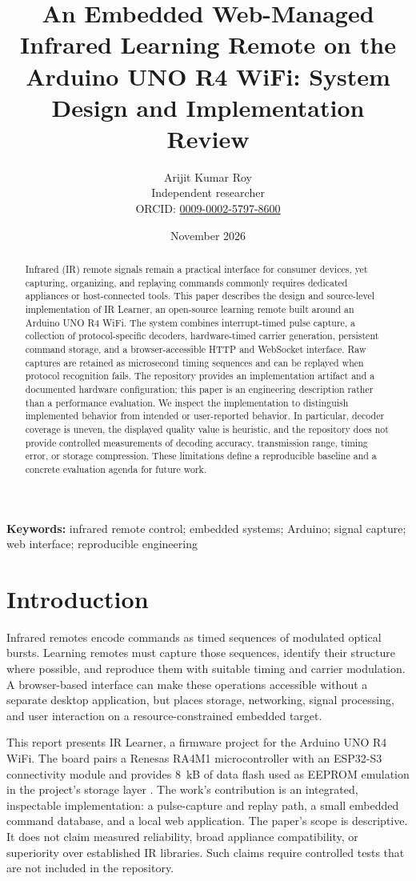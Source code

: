 \documentclass[11pt]{article}
\title{An Embedded Web-Managed Infrared Learning Remote on the Arduino UNO R4 WiFi: System Design and Implementation Review}
\author{Arijit Kumar Roy\\\small Independent researcher\\\small ORCID: \href{https://orcid.org/0009-0002-5797-8600}{0009-0002-5797-8600}}
\date{November 2026}
\begin{document}
\maketitle

\begin{abstract}
Infrared (IR) remote signals remain a practical interface for consumer devices, yet capturing, organizing, and replaying commands commonly requires dedicated appliances or host-connected tools. This paper describes the design and source-level implementation of IR Learner, an open-source learning remote built around an Arduino UNO R4 WiFi. The system combines interrupt-timed pulse capture, a collection of protocol-specific decoders, hardware-timed carrier generation, persistent command storage, and a browser-accessible HTTP and WebSocket interface. Raw captures are retained as microsecond timing sequences and can be replayed when protocol recognition fails. The repository provides an implementation artifact and a documented hardware configuration; this paper is an engineering description rather than a performance evaluation. We inspect the implementation to distinguish implemented behavior from intended or user-reported behavior. In particular, decoder coverage is uneven, the displayed quality value is heuristic, and the repository does not provide controlled measurements of decoding accuracy, transmission range, timing error, or storage compression. These limitations define a reproducible baseline and a concrete evaluation agenda for future work.
\end{abstract}

\noindent\textbf{Keywords:} infrared remote control; embedded systems; Arduino; signal capture; web interface; reproducible engineering

\section{Introduction}
Infrared remotes encode commands as timed sequences of modulated optical bursts. Learning remotes must capture those sequences, identify their structure where possible, and reproduce them with suitable timing and carrier modulation. A browser-based interface can make these operations accessible without a separate desktop application, but places storage, networking, signal processing, and user interaction on a resource-constrained embedded target.

This report presents IR Learner, a firmware project for the Arduino UNO R4 WiFi. The board pairs a Renesas RA4M1 microcontroller with an ESP32-S3 connectivity module and provides 8~kB of data flash used as EEPROM emulation in the project's storage layer \citep{arduinoUnoR4Datasheet}. The work's contribution is an integrated, inspectable implementation: a pulse-capture and replay path, a small embedded command database, and a local web application. The paper's scope is descriptive. It does not claim measured reliability, broad appliance compatibility, or superiority over established IR libraries. Such claims require controlled tests that are not included in the repository.
\end{document}
